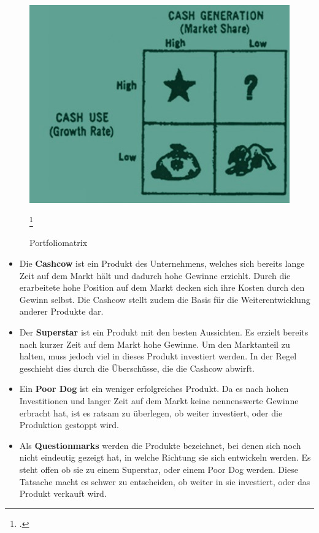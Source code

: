     \begin{figure}[H]
      \begin{centering}
      \includegraphics[width = 1\textwidth]{Bilder/portfoliomatrix.jpg}
      \par\end{centering}
      \caption{Portfoliomatrix}
      \label{matrix}
      \footcite{pic_matrix}
    \end{figure}

    \begin{itemize}
      \item Die \textbf{Cashcow} ist ein Produkt des Unternehmens, welches sich bereits lange Zeit auf dem Markt hält und dadurch hohe Gewinne erziehlt. Durch die
      erarbeitete hohe Position auf dem Markt decken sich ihre Kosten durch den Gewinn selbst. Die Cashcow stellt zudem die Basis für die Weiterentwicklung anderer
      Produkte dar.

      \item Der \textbf{Superstar} ist ein Produkt mit den besten Aussichten. Es erzielt bereits nach kurzer Zeit auf dem Markt hohe Gewinne. Um den Marktanteil
      zu halten, muss jedoch viel in dieses Produkt investiert werden. In der Regel geschieht dies durch die Überschüsse, die die Cashcow abwirft.

      \item Ein \textbf{Poor Dog} ist ein weniger erfolgreiches Produkt. Da es nach hohen Investitionen und langer Zeit auf dem Markt keine nennenswerte
      Gewinne erbracht hat, ist es ratsam zu überlegen, ob weiter investiert, oder die Produktion gestoppt wird.

      \item Als \textbf{Questionmarks} werden die Produkte bezeichnet, bei denen sich noch nicht eindeutig gezeigt hat, in welche Richtung sie sich entwickeln werden.
      Es steht offen ob sie zu einem Superstar, oder einem Poor Dog werden. Diese Tatsache macht es schwer zu entscheiden, ob weiter in sie investiert, oder das Produkt
      verkauft wird.
    \end{itemize}

